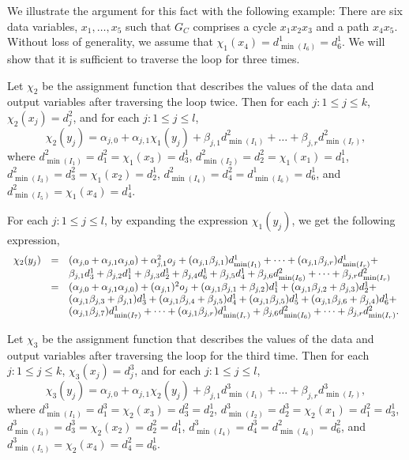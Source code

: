 We illustrate the argument for this fact with the following example: There are six data variables, $x_1,\dots,x_5$ such that  $G_C$ comprises a cycle $x_1x_2x_3$ and a path $x_4 x_5$. Without loss of generality, we assume that $\chi_1(x_4)=d^1_{\min(I_6)}=d^1_6$. We will show that it is sufficient to traverse the loop for three times.

Let $\chi_2$ be the assignment function that describes the values of the data and output variables after traversing the loop twice. Then for each $j: 1 \le j \le k$, $\chi_2(x_j)=d^2_j$, and for each $j: 1 \le j \le l$, 
\[\chi_2(y_j) = \alpha_{j,0} + \alpha_{j,1} \chi_1(y_j) + \beta_{j,1} d^2_{\min(I_1)} + \dots + \beta_{j,r} d^2_{\min(I_r)},\]
where $d^2_{\min(I_1)}=d^2_1 = \chi_1(x_3)=d^1_3$, $d^2_{\min(I_2)}=d^2_2 = \chi_1(x_1)=d^1_1$, $d^2_{\min(I_3)}=d^2_3 = \chi_1(x_2)=d^1_2$, $d^2_{\min(I_4)}=d^2_4 = d^1_{\min(I_6)}=d^1_6$, and $d^2_{\min(I_5)}=\chi_1(x_4)=d^1_4$.

For each $j: 1 \le j \le l$, 
by expanding the expression $\chi_1(y_j)$, we  get the following expression, 
\[
\begin{array}{l c l}
\chi_2(y_j) & = & (\alpha_{j,0} + \alpha_{j,1} \alpha_{j,0}) + \alpha^2_{j,1} o_j + (\alpha_{j,1} \beta_{j,1}) d^1_{\min(I_1)} +  \dots + (\alpha_{j,1} \beta_{j,r}) d^1_{\min(I_r)} + \\
& &  \beta_{j,1} d^1_3 + \beta_{j,2} d^1_1 + \beta_{j,3} d^1_2 + \beta_{j,4} d^1_6 + \beta_{j,5} d^1_4 + \beta_{j,6} d^2_{\min(I_6)} + \dots + \beta_{j,r} d^2_{\min(I_r)}\\
& = & (\alpha_{j,0} + \alpha_{j,1} \alpha_{j,0}) + (\alpha_{j,1})^2 o_j + (\alpha_{j,1} \beta_{j,1} + \beta_{j,2}) d^1_1 + (\alpha_{j,1}\beta_{j,2}+\beta_{j,3})d^1_2+\\
& & (\alpha_{j,1}\beta_{j,3}+\beta_{j,1})d^1_3 +  (\alpha_{j,1}\beta_{j,4}+\beta_{j,5})d^1_4 + (\alpha_{j,1}\beta_{j,5})d^1_5 + (\alpha_{j,1}\beta_{j,6}+\beta_{j,4})d^1_6 + \\
& & (\alpha_{j,1}\beta_{j,7}) d^1_{\min(I_7)} + \dots + (\alpha_{j,1}\beta_{j,r}) d^1_{\min(I_r)} + \beta_{j,6} d^2_{\min(I_6)} + \dots + \beta_{j,r} d^2_{\min(I_r)}.
\end{array}
\] 

Let $\chi_3$ be the assignment function that describes the values of the data and output variables after traversing the loop for the third time. Then for each $j: 1 \le j \le k$, $\chi_3(x_j)=d^3_j$, and for each $j: 1 \le j \le l$, 
\[\chi_3(y_j) = \alpha_{j,0} + \alpha_{j,1} \chi_2(y_j) + \beta_{j,1} d^3_{\min(I_1)} + \dots + \beta_{j,r} d^3_{\min(I_r)},\]
where $d^3_{\min(I_1)}=d^3_1 = \chi_2(x_3)=d^2_3=d^1_2$, $d^3_{\min(I_2)}=d^3_2 = \chi_2(x_1)=d^2_1=d^1_3$, $d^3_{\min(I_3)}=d^3_3 = \chi_2(x_2)=d^2_2=d^1_1$, $d^3_{\min(I_4)}=d^3_4 = d^2_{\min(I_6)}=d^2_6$, and $d^3_{\min(I_5)}=\chi_2(x_4)=d^2_4=d^1_6$.

